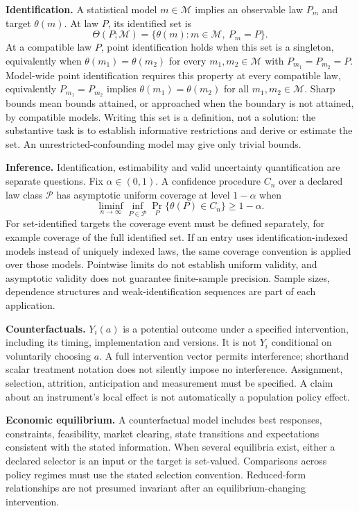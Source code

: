 \documentclass[11pt,a4paper]{article}
\begin{document}
\textbf{Identification.} A statistical model $m\in\mathcal M$ implies an observable law $P_m$ and target $\theta(m)$. At law $P$, its identified set is
\[
\Theta(P;\mathcal M)=\{\theta(m):m\in\mathcal M,\ P_m=P\}.
\]
At a compatible law $P$, point identification holds when this set is a singleton, equivalently when $\theta(m_1)=\theta(m_2)$ for every $m_1,m_2\in\mathcal M$ with $P_{m_1}=P_{m_2}=P$. Model-wide point identification requires this property at every compatible law, equivalently $P_{m_1}=P_{m_2}$ implies $\theta(m_1)=\theta(m_2)$ for all $m_1,m_2\in\mathcal M$. Sharp bounds mean bounds attained, or approached when the boundary is not attained, by compatible models. Writing this set is a definition, not a solution: the substantive task is to establish informative restrictions and derive or estimate the set. An unrestricted-confounding model may give only trivial bounds.

\textbf{Inference.} Identification, estimability and valid uncertainty quantification are separate questions. Fix $\alpha\in(0,1)$. A confidence procedure $C_n$ over a declared law class $\mathcal P$ has asymptotic uniform coverage at level $1-\alpha$ when
\[
\liminf_{n\to\infty}\inf_{P\in\mathcal P}\Pr_P\{\theta(P)\in C_n\}\geq1-\alpha.
\]
For set-identified targets the coverage event must be defined separately, for example coverage of the full identified set. If an entry uses identification-indexed models instead of uniquely indexed laws, the same coverage convention is applied over those models. Pointwise limits do not establish uniform validity, and asymptotic validity does not guarantee finite-sample precision. Sample sizes, dependence structures and weak-identification sequences are part of each application.

\textbf{Counterfactuals.} $Y_i(a)$ is a potential outcome under a specified intervention, including its timing, implementation and versions. It is not $Y_i$ conditional on voluntarily choosing $a$. A full intervention vector permits interference; shorthand scalar treatment notation does not silently impose no interference. Assignment, selection, attrition, anticipation and measurement must be specified. A claim about an instrument's local effect is not automatically a population policy effect.

\textbf{Economic equilibrium.} A counterfactual model includes best responses, constraints, feasibility, market clearing, state transitions and expectations consistent with the stated information. When several equilibria exist, either a declared selector is an input or the target is set-valued. Comparisons across policy regimes must use the stated selection convention. Reduced-form relationships are not presumed invariant after an equilibrium-changing intervention.
\end{document}
